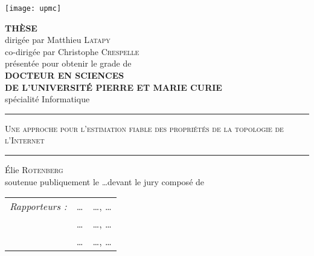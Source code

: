 \addtolength{\oddsidemargin}{-5mm}
\addtolength{\textwidth}{3mm}
\addtolength{\topmargin}{-19mm}
\enlargethispage{30mm}



\begin{center}
\texttt{[image: upmc]}

\vfill





\Large
\textbf{THÈSE}\\
\bigskip
\normalsize
dirigée par Matthieu \textsc{Latapy}\\
co-dirigée par Christophe \textsc{Crespelle}\\
\bigskip
présentée pour obtenir le grade de \\
\bigskip
\large
\textbf{DOCTEUR EN SCIENCES \\ DE L'UNIVERSITÉ PIERRE ET MARIE CURIE}\\
\medskip
\large
{spécialité Informatique}\\
\vfill
{\color{darkred} \rule{0.9\textwidth}{0.5mm}}
\begin{minipage}[c]{.96\textwidth}
	\begin{center}
	\vspace*{8mm}
	\Large
	\textsc{
	Une approche pour l'estimation fiable des propriétés de la topologie de
	l'Internet
	}
	\vspace*{8mm}
	\end{center}
\end{minipage}
{\color{darkred} \rule{0.98\textwidth}{0.5mm} }
\vfill
{\Large \'Elie \textsc{Rotenberg}\\}
\bigskip
\vfill
\normalsize
\noindent soutenue publiquement le \ldots devant le jury composé de~\\
\bigskip
\begin{tabular}{lll}
\textit{Rapporteurs :}  & \ldots & \ldots, \ldots\\
& \ldots & \ldots, \ldots\\
& \ldots & \ldots, \ldots\\


\end{tabular}
\end{center}
